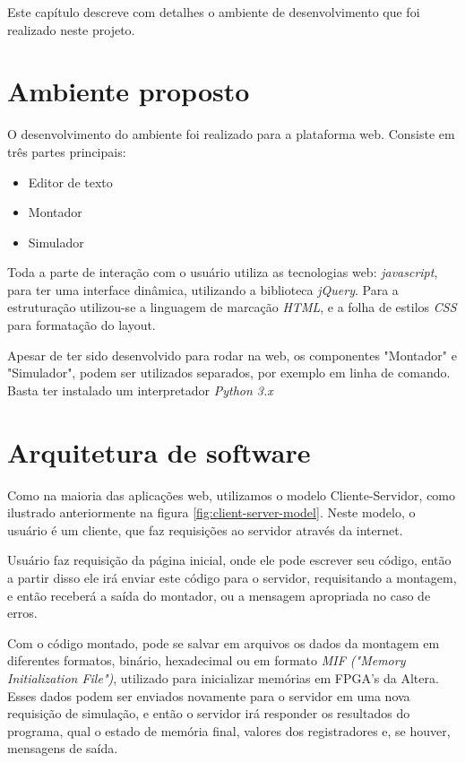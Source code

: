 Este capítulo descreve com detalhes o ambiente de desenvolvimento que foi realizado neste projeto.

\section{Ambiente proposto}%

	O desenvolvimento do ambiente foi realizado para a plataforma web. Consiste em três partes principais:
	
	\begin{itemize}
		\item Editor de texto
		\item Montador
		\item Simulador
	\end{itemize}

	Toda a parte de interação com o usuário utiliza as tecnologias web: \textit{javascript}, para ter uma interface dinâmica, utilizando a biblioteca \textit{jQuery}. Para a estruturação utilizou-se a linguagem de marcação \textit{HTML}, e a folha de estilos \textit{CSS} para formatação do layout.

	Apesar de ter sido desenvolvido para rodar na web, os componentes "Montador" e "Simulador", podem ser utilizados separados, por exemplo em linha de comando. Basta ter instalado um interpretador \textit{Python 3.x}


\section{Arquitetura de software}

	Como na maioria das aplicações web, utilizamos o modelo Cliente-Servidor, como ilustrado anteriormente na figura \ref{fig:client-server-model}. Neste modelo, o usuário é um cliente, que faz requisições ao servidor através da internet. 

	Usuário faz requisição da página inicial, onde ele pode escrever seu código, então a partir disso ele irá enviar este código para o servidor, requisitando a montagem, e então receberá a saída do montador, ou a mensagem apropriada no caso de erros.

	Com o código montado, pode se salvar em arquivos os dados da montagem em diferentes formatos, binário, hexadecimal ou em formato \textit{MIF ("Memory Initialization File")}, utilizado para inicializar memórias em FPGA's da Altera. Esses dados podem ser enviados novamente para o servidor em uma nova requisição de simulação, e então o servidor irá responder os resultados do programa, qual o estado de memória final, valores dos registradores e, se houver, mensagens de saída.

